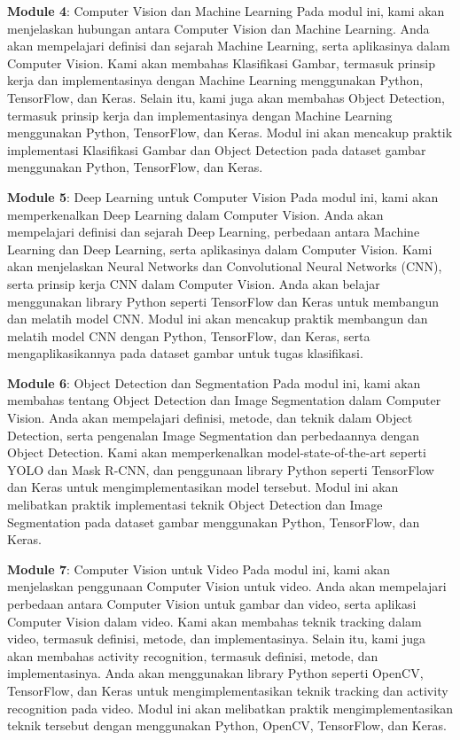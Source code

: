 \documentclass[
  letterpaper,
  DIV=11,
  numbers=noendperiod]{scrreprt}
\begin{document}
\textbf{Module 4}: Computer Vision dan Machine Learning Pada modul ini,
kami akan menjelaskan hubungan antara Computer Vision dan Machine
Learning. Anda akan mempelajari definisi dan sejarah Machine Learning,
serta aplikasinya dalam Computer Vision. Kami akan membahas Klasifikasi
Gambar, termasuk prinsip kerja dan implementasinya dengan Machine
Learning menggunakan Python, TensorFlow, dan Keras. Selain itu, kami
juga akan membahas Object Detection, termasuk prinsip kerja dan
implementasinya dengan Machine Learning menggunakan Python, TensorFlow,
dan Keras. Modul ini akan mencakup praktik implementasi Klasifikasi
Gambar dan Object Detection pada dataset gambar menggunakan Python,
TensorFlow, dan Keras.

\textbf{Module 5}: Deep Learning untuk Computer Vision Pada modul ini,
kami akan memperkenalkan Deep Learning dalam Computer Vision. Anda akan
mempelajari definisi dan sejarah Deep Learning, perbedaan antara Machine
Learning dan Deep Learning, serta aplikasinya dalam Computer Vision.
Kami akan menjelaskan Neural Networks dan Convolutional Neural Networks
(CNN), serta prinsip kerja CNN dalam Computer Vision. Anda akan belajar
menggunakan library Python seperti TensorFlow dan Keras untuk membangun
dan melatih model CNN. Modul ini akan mencakup praktik membangun dan
melatih model CNN dengan Python, TensorFlow, dan Keras, serta
mengaplikasikannya pada dataset gambar untuk tugas klasifikasi.

\textbf{Module 6}: Object Detection dan Segmentation Pada modul ini,
kami akan membahas tentang Object Detection dan Image Segmentation dalam
Computer Vision. Anda akan mempelajari definisi, metode, dan teknik
dalam Object Detection, serta pengenalan Image Segmentation dan
perbedaannya dengan Object Detection. Kami akan memperkenalkan
model-state-of-the-art seperti YOLO dan Mask R-CNN, dan penggunaan
library Python seperti TensorFlow dan Keras untuk mengimplementasikan
model tersebut. Modul ini akan melibatkan praktik implementasi teknik
Object Detection dan Image Segmentation pada dataset gambar menggunakan
Python, TensorFlow, dan Keras.

\textbf{Module 7}: Computer Vision untuk Video Pada modul ini, kami akan
menjelaskan penggunaan Computer Vision untuk video. Anda akan
mempelajari perbedaan antara Computer Vision untuk gambar dan video,
serta aplikasi Computer Vision dalam video. Kami akan membahas teknik
tracking dalam video, termasuk definisi, metode, dan implementasinya.
Selain itu, kami juga akan membahas activity recognition, termasuk
definisi, metode, dan implementasinya. Anda akan menggunakan library
Python seperti OpenCV, TensorFlow, dan Keras untuk mengimplementasikan
teknik tracking dan activity recognition pada video. Modul ini akan
melibatkan praktik mengimplementasikan teknik tersebut dengan
menggunakan Python, OpenCV, TensorFlow, dan Keras.
\end{document}
